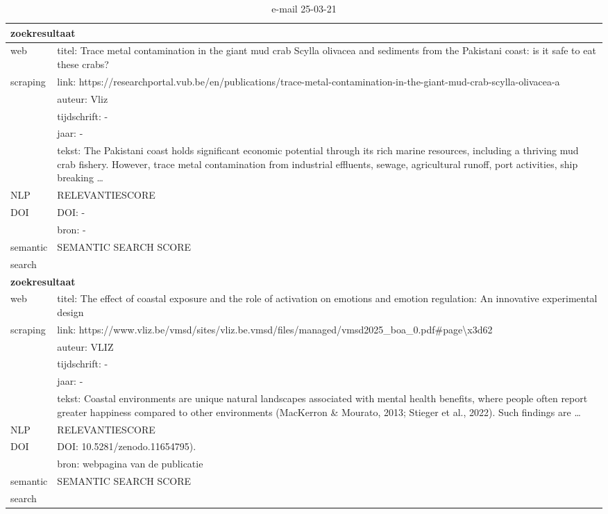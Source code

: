 \begin{table}[h!]
    \caption{e-mail 25-03-21}
    \centering
    \begin{tabularx}{\textwidth}{|p{4cm}|X|} 
        \hline
        \multicolumn{2}{|X|}{\textbf{zoekresultaat}} \\
        \hline
        web &titel: Trace metal contamination in the giant mud crab Scylla olivacea and sediments from the Pakistani coast: is it safe to eat these crabs?\\
        scraping&link: https://researchportal.vub.be/en/publications/trace-metal-contamination-in-the-giant-mud-crab-scylla-olivacea-a\\
        &auteur: Vliz\\
        &tijdschrift: -\\
        &jaar: -\\
        &tekst: The Pakistani coast holds significant economic potential through its rich marine resources, including a thriving mud crab fishery. However, trace metal contamination from industrial effluents, sewage, agricultural runoff, port activities, ship breaking …\\
        \hline
        NLP&RELEVANTIESCORE\\
        \hline
        DOI&DOI: -\\
        &bron: -\\
        \hline
        semantic&SEMANTIC SEARCH SCORE\\
        search&\\
        \hline
        \multicolumn{2}{|X|}{\textbf{zoekresultaat}} \\
        \hline
        web &titel: The effect of coastal exposure and the role of activation on emotions and emotion regulation: An innovative experimental design\\
        scraping&link: https://www.vliz.be/vmsd/sites/vliz.be.vmsd/files/managed/vmsd2025\_boa\_0.pdf#page\textbackslash x3d62\\
         &auteur: VLIZ\\
        &tijdschrift: -\\
        &jaar: -\\
        &tekst: Coastal environments are unique natural landscapes associated with mental health benefits, where people often report greater happiness compared to other environments (MacKerron \& Mourato, 2013; Stieger et al., 2022). Such findings are …\\
        \hline
        NLP&RELEVANTIESCORE\\
        \hline
        DOI&DOI: 10.5281/zenodo.11654795).\\
        &bron: webpagina van de publicatie\\
        \hline
        semantic&SEMANTIC SEARCH SCORE\\
        search&\\
        \hline
    \end{tabularx}
    \label{table:email20250321}
\end{table}
